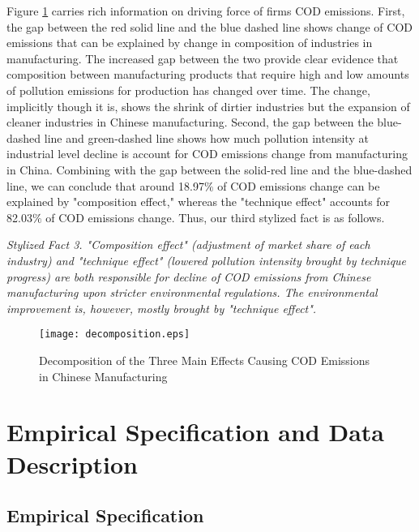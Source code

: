 \documentclass[12pt,english]{article}
\begin{document}
Figure \ref{fig:decomposition} carries rich information on driving force of firms COD emissions. First, the gap between the red solid line and the blue dashed line shows change of COD emissions that can be explained by change in composition of industries in manufacturing. The increased gap between the two provide clear evidence that composition between manufacturing products that require high and low amounts of pollution emissions for production has changed over time. %
 The change, implicitly though it is, shows the shrink of dirtier industries but the expansion of cleaner industries in Chinese manufacturing.
 Second, the gap between the blue-dashed line and green-dashed line shows how much pollution intensity at industrial level decline is account for COD emissions change from manufacturing in China. Combining with the gap between the solid-red line and the blue-dashed line, we can conclude that around 18.97$\%$ of COD emissions change can be explained by "composition effect," whereas the "technique effect" accounts for 82.03$\%$ of COD emissions change. Thus, our third stylized fact is as follows.

\textit{Stylized Fact 3. "Composition effect" (adjustment of market share of each industry) and "technique effect" (lowered pollution intensity brought by technique progress) are both responsible for decline of COD emissions from Chinese manufacturing upon stricter environmental regulations. The environmental improvement is, however, mostly brought by "technique effect".}

\begin{figure}[htbp]
	\caption{Decomposition of the Three Main Effects Causing COD Emissions in Chinese Manufacturing}
	\label{fig:decomposition}
	\centering
	\texttt{[image: decomposition.eps]}
\end{figure}

\section {Empirical Specification and Data Description}\label{sec:empirical,data and measurement}

\subsection{Empirical Specification}\label{sec:specification}
\end{document}
